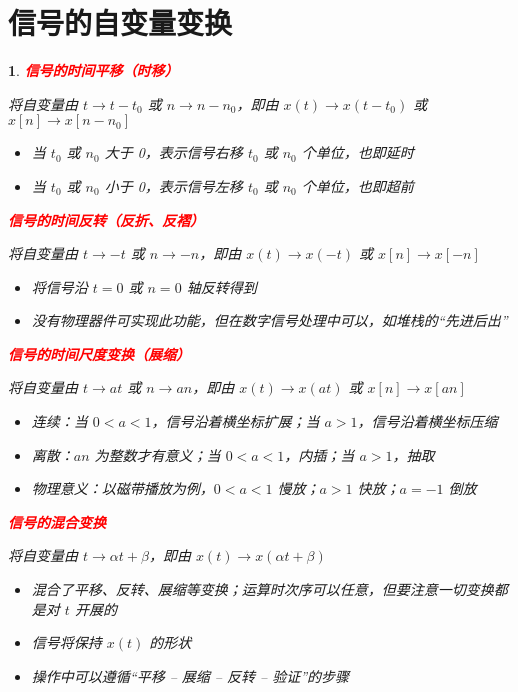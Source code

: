 \documentclass[UTF8]{report}
\theoremstyle{MyLineTheoremStyle} %
\theoremstyle{MyBlockTheoremStyle} %
\theoremstyle{MySubsubsectionStyle} %
\newtheorem{definition}{}
\begin{document}
\section{信号的自变量变换}

\begin{definition}
    \textbf{\textcolor{red}{信号的时间平移（时移）}}\par
    \vspace{1em}
    将自变量由 $t \rightarrow t - t_0$ 或 $n \rightarrow n - n_0$，即由 $x(t) \rightarrow x(t - t_0)$ 或 $x[n] \rightarrow x[n - n_0]$
    \begin{itemize}
        \item 当 $t_0$ 或 $n_0$ 大于 0，表示信号右移 $t_0$ 或 $n_0$ 个单位，也即延时
        \item 当 $t_0$ 或 $n_0$ 小于 0，表示信号左移 $t_0$ 或 $n_0$ 个单位，也即超前
    \end{itemize}

    \textbf{\textcolor{red}{信号的时间反转（反折、反褶）}}\par
    \vspace{1em}
    将自变量由 $t \rightarrow -t$ 或 $n \rightarrow -n$，即由 $x(t) \rightarrow x(-t)$ 或 $x[n] \rightarrow x[-n]$
    \begin{itemize}
        \item 将信号沿 $t = 0$ 或 $n = 0$ 轴反转得到
        \item 没有物理器件可实现此功能，但在数字信号处理中可以，如堆栈的“先进后出”
    \end{itemize}

    \textbf{\textcolor{red}{信号的时间尺度变换（展缩）}}\par
    \vspace{1em}
    将自变量由 $t \rightarrow at$ 或 $n \rightarrow an$，即由 $x(t) \rightarrow x(at)$ 或 $x[n] \rightarrow x[an]$
    \begin{itemize}
        \item 连续：当 $0 < a < 1$，信号沿着横坐标扩展；当 $a > 1$，信号沿着横坐标压缩
        \item 离散：$an$ 为整数才有意义；当 $0 < a < 1$，内插；当 $a > 1$，抽取
        \item 物理意义：以磁带播放为例，$0 < a < 1$ 慢放；$a > 1$ 快放；$a = -1$ 倒放
    \end{itemize}

    \textbf{\textcolor{red}{信号的混合变换}}\par
    \vspace{1em}
    将自变量由 $t \rightarrow \alpha t + \beta$，即由 $x(t) \rightarrow x(\alpha t + \beta)$
    \begin{itemize}
        \item 混合了平移、反转、展缩等变换；运算时次序可以任意，但要注意一切变换都是对 $t$ 开展的
        \item 信号将保持 $x(t)$ 的形状
        \item 操作中可以遵循“平移 – 展缩 – 反转 – 验证”的步骤
    \end{itemize}


\end{definition}
\end{document}
